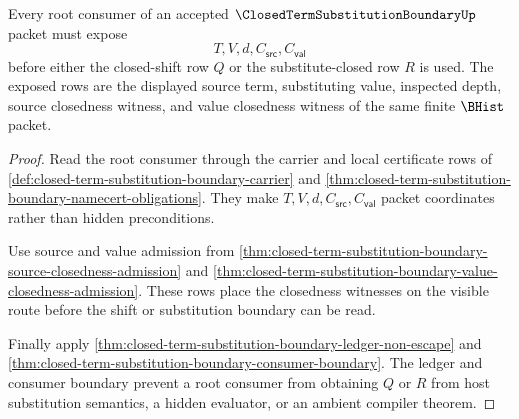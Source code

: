 \begin{theorem}
\label{thm:closed-term-substitution-boundary-root-value-visibility}
Every root consumer of an accepted $\ClosedTermSubstitutionBoundaryUp$ packet must expose
$$
T,V,d,C_{\mathsf{src}},C_{\mathsf{val}}
$$
before either the closed-shift row $Q$ or the substitute-closed row $R$ is used. The exposed rows are the displayed source term, substituting value, inspected depth, source closedness witness, and value closedness witness of the same finite $\BHist$ packet.
\end{theorem}
\begin{proof}
Read the root consumer through the carrier and local certificate rows of \autoref{def:closed-term-substitution-boundary-carrier} and \autoref{thm:closed-term-substitution-boundary-namecert-obligations}. They make $T,V,d,C_{\mathsf{src}},C_{\mathsf{val}}$ packet coordinates rather than hidden preconditions.

Use source and value admission from \autoref{thm:closed-term-substitution-boundary-source-closedness-admission} and \autoref{thm:closed-term-substitution-boundary-value-closedness-admission}. These rows place the closedness witnesses on the visible route before the shift or substitution boundary can be read.

Finally apply \autoref{thm:closed-term-substitution-boundary-ledger-non-escape} and \autoref{thm:closed-term-substitution-boundary-consumer-boundary}. The ledger and consumer boundary prevent a root consumer from obtaining $Q$ or $R$ from host substitution semantics, a hidden evaluator, or an ambient compiler theorem.
\end{proof}

